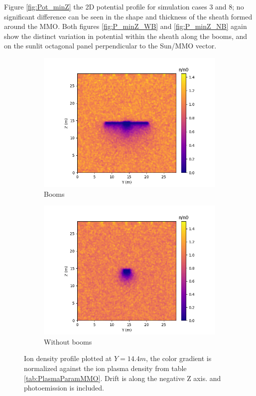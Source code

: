 Figure \ref{fig:Pot_minZ} the 2D potential profile for simulation cases 3 and 8; no significant difference can be seen in the shape and thickness of the sheath formed around the MMO. Both figures \ref{fig:P_minZ_WB} and \ref{fig:P_minZ_NB} again show the distinct variation in potential within the sheath along the booms, and on the sunlit octagonal panel perpendicular to the Sun/MMO vector. 

\begin{figure}[H]
  \begin{subfigure}[b]{0.6\textwidth}
  \includegraphics[width=\textwidth]{figures/MMO/minZ/WB/I_minZ_WB.png}
  \caption{Booms}
  \label{fig:I_minZ_WB}
\end{subfigure}
\begin{subfigure}[b]{0.6\textwidth}
  \includegraphics[width=\textwidth]{figures/MMO/minZ/NB/I_minZ_NB.png}
  \caption{Without booms}
  \label{fig:I_minZ_NB}
\end{subfigure}
\label{fig:Ion_minZ}
\caption{Ion density profile plotted at $Y = 14.4 m$, the color gradient is normalized against the ion plasma density from table \ref{tab:PlasmaParamMMO}. Drift is along the negative Z axis. and photoemission is included.}
\end{figure}

